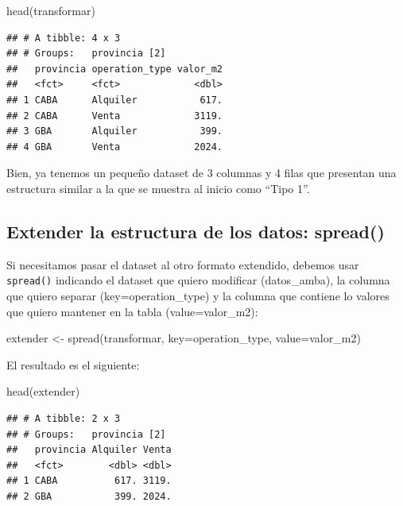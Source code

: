 \documentclass[
  spanish,
]{book}
\newenvironment{Shaded}{\begin{snugshade}}{\end{snugshade}}
\newcommand{\AttributeTok}[1]{\textcolor[rgb]{0.77,0.63,0.00}{#1}}
\newcommand{\FunctionTok}[1]{\textcolor[rgb]{0.00,0.00,0.00}{#1}}
\newcommand{\NormalTok}[1]{#1}
\newcommand{\OtherTok}[1]{\textcolor[rgb]{0.56,0.35,0.01}{#1}}
\begin{document}
\begin{Shaded}
\begin{Highlighting}[]
\FunctionTok{head}\NormalTok{(transformar)}
\end{Highlighting}
\end{Shaded}

\begin{verbatim}
## # A tibble: 4 x 3
## # Groups:   provincia [2]
##   provincia operation_type valor_m2
##   <fct>     <fct>             <dbl>
## 1 CABA      Alquiler           617.
## 2 CABA      Venta             3119.
## 3 GBA       Alquiler           399.
## 4 GBA       Venta             2024.
\end{verbatim}

Bien, ya tenemos un pequeño dataset de 3 columnas y 4 filas que presentan una estructura similar a la que se muestra al inicio como ``Tipo 1''.

\hypertarget{extender-la-estructura-de-los-datos-spread}{%
\subsection{Extender la estructura de los datos: spread()}\label{extender-la-estructura-de-los-datos-spread}}

Si necesitamos pasar el dataset al otro formato extendido, debemos usar \texttt{spread()} indicando el dataset que quiero modificar (datos\_amba), la columna que quiero separar (key=operation\_type) y la columna que contiene lo valores que quiero mantener en la tabla (value=valor\_m2):

\begin{Shaded}
\begin{Highlighting}[]
\NormalTok{extender }\OtherTok{\textless{}{-}} \FunctionTok{spread}\NormalTok{(transformar, }\AttributeTok{key=}\NormalTok{operation\_type, }\AttributeTok{value=}\NormalTok{valor\_m2)}
\end{Highlighting}
\end{Shaded}

El resultado es el siguiente:

\begin{Shaded}
\begin{Highlighting}[]
\FunctionTok{head}\NormalTok{(extender)}
\end{Highlighting}
\end{Shaded}

\begin{verbatim}
## # A tibble: 2 x 3
## # Groups:   provincia [2]
##   provincia Alquiler Venta
##   <fct>        <dbl> <dbl>
## 1 CABA          617. 3119.
## 2 GBA           399. 2024.
\end{verbatim}
\end{document}
